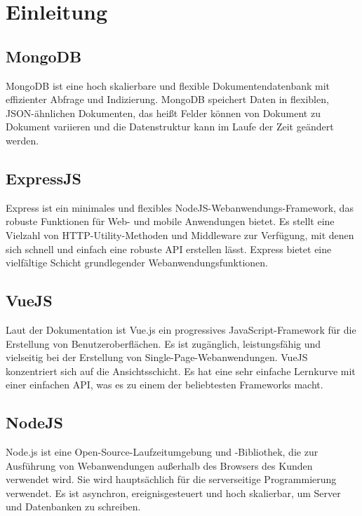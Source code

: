 \chapter{Einleitung} \label{sec:definition}
\section{MongoDB}
MongoDB ist eine hoch skalierbare und flexible Dokumentendatenbank mit effizienter Abfrage und Indizierung. MongoDB speichert Daten in flexiblen, JSON-ähnlichen Dokumenten, das heißt Felder können von Dokument zu Dokument variieren und die Datenstruktur kann im Laufe der Zeit geändert werden.

\section{ExpressJS}
Express ist ein minimales und flexibles NodeJS-Webanwendungs-Framework, das robuste Funktionen für Web- und mobile Anwendungen bietet. Es stellt eine Vielzahl von HTTP-Utility-Methoden und Middleware zur Verfügung, mit denen sich schnell und einfach eine robuste API erstellen lässt. Express bietet eine vielfältige Schicht grundlegender Webanwendungsfunktionen.

\section{VueJS}
Laut der Dokumentation ist Vue.js ein progressives JavaScript-Framework für die Erstellung von Benutzeroberflächen. Es ist zugänglich, leistungsfähig und vielseitig bei der Erstellung von Single-Page-Webanwendungen.
VueJS konzentriert sich auf die Ansichtsschicht. Es hat eine sehr einfache Lernkurve mit einer einfachen API, was es zu einem der beliebtesten Frameworks macht.

\section{NodeJS}
Node.js ist eine Open-Source-Laufzeitumgebung und -Bibliothek, die zur Ausführung von Webanwendungen außerhalb des Browsers des Kunden verwendet wird. Sie wird hauptsächlich für die serverseitige Programmierung verwendet. Es ist asynchron, ereignisgesteuert und hoch skalierbar, um Server und Datenbanken zu schreiben.

